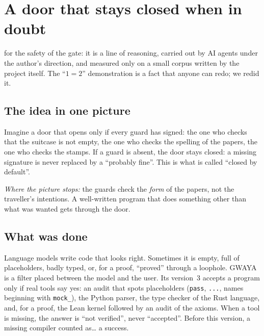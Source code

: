 \chapter[A door closed by default]{A door that stays closed when in doubt}

\noindent{} for the safety of the gate: it is a line of reasoning, carried out by AI agents under the author's direction, and
measured only on a small corpus written by the project itself. The ``$1=2$'' demonstration is a fact that anyone can redo; we redid it.

\section*{The idea in one picture}

\begin{analogie}
Imagine a door that opens only if every guard has signed: the one who checks that the suitcase is not empty, the one
who checks the spelling of the papers, the one who checks the stamps. If a guard is absent, the door stays closed:
a missing signature is never replaced by a ``probably fine''. This is what is called ``closed by default''.

\emph{Where the picture stops:} the guards check the \emph{form} of the papers, not the traveller's intentions. A
well-written program that does something other than what was wanted gets through the door.
\end{analogie}

\section*{What was done}

Language models write code that looks right. Sometimes it is empty, full of placeholders, badly typed, or, for a
proof, ``proved'' through a loophole. GWAYA is a filter placed between the model and the user. Its version~3
accepts a program only if real tools say yes: an audit that spots placeholders (\texttt{pass}, \texttt{...}, names
beginning with \texttt{mock\_}), the Python parser, the type checker of the Rust language, and, for a proof, the
Lean kernel followed by an audit of the axioms. When a tool is missing, the answer is ``not verified'', never
``accepted''. Before this version, a missing compiler counted as\ldots{} a success.

